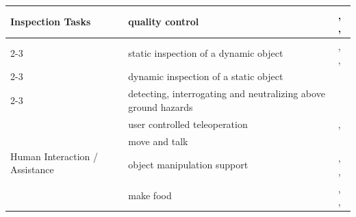 \begin{table}[p]
\begin{tabular}{|p{4cm}|p{5cm}|p{15cm}|}
\hline
\multirow{4}{*}{\parbox{3cm}{Inspection Tasks}}
    & quality control                                                & \cite{Partovi2017ReactiveIM}, \cite{Pedersen2016RobotSF}, \cite{MacKenzie1996BehaviorbasedMM} \\
\cline{2-3}
    & static inspection of a dynamic object                          & \cite{Donald2024AnAF}, \cite{Kenney2009InteractiveSF}, \cite{Yang2026VisionLanguageActionME} \\
\cline{2-3}
    & dynamic inspection of a static object                          & \cite{Donald2024AnAF} \\
\cline{2-3}
    & detecting, interrogating and neutralizing above ground hazards & \cite{Bruemmer2010BehaviorBC} \\
\hline
\multirow{4}{*}{\parbox{3cm}{Human Interaction / Assistance}}
    & user controlled teleoperation                                  & \cite{Maeda2022BlendingPP}, \cite{Klamt2018SupervisedAL} \\
\cline{2-3}
    & move and talk                                                  & \cite{Stckler2009IntegratingIM} \\
\cline{2-3}
    & object manipulation support                                    & \cite{Ding2022IntelligentAF}, \cite{Stuckler2012RoboCupHomeDE}, \cite{Kumbhar2025MPCQPBasedCF} \\
\cline{2-3}
    & make food                                                      & \cite{Beetz2016OpenRR}, \cite{Rosen2023SynthesizingNA}, \cite{Confente2025SkinMachineIW} \\
\hline
\end{tabular}
\end{table}

